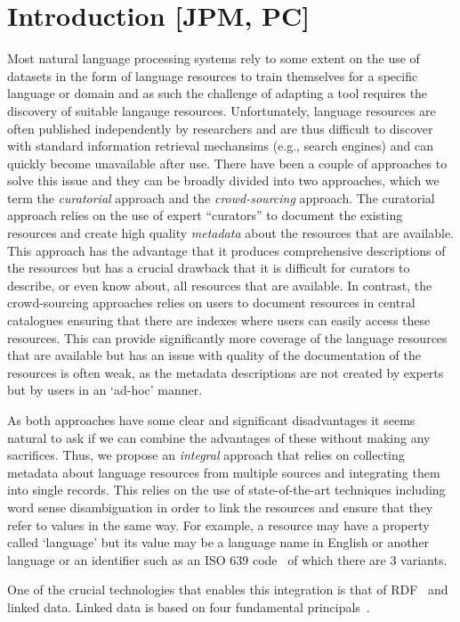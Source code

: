\documentclass[smallextended]{svjour3}       %
\begin{document}
\section{Introduction [JPM, PC]}

Most natural language processing systems rely to some extent on the use of
datasets in the form of language resources to train themselves for a specific
language or domain and as such the challenge of adapting a tool requires the
discovery of suitable langauge resources. Unfortunately, language resources are
often published independently by researchers and are thus difficult to discover
with standard information retrieval mechansims (e.g., search engines) and can
quickly become unavailable after use. There have been a couple of approaches to
solve this issue and they can be broadly divided into two approaches, which we
term the \emph{curatorial} approach and the \emph{crowd-sourcing} approach. The
curatorial approach relies on the use of expert ``curators'' to document the
existing resources and create high quality \emph{metadata} about the resources
that are available. This approach has the advantage that it produces
comprehensive descriptions of the resources but has a crucial drawback that it
is difficult for curators to describe, or even know about, all resources that
are available. In contrast, the crowd-sourcing approaches relies on users to
document resources in central catalogues ensuring that there are indexes where
users can easily access these resources. This can provide significantly more
coverage of the language resources that are available but has an issue with
quality of the documentation of the resources is often weak, as the metadata
descriptions are not created by experts but by users in an `ad-hoc' manner.

As both approaches have some clear and significant disadvantages it seems
natural to ask if we can combine the advantages of these without making any
sacrifices. Thus, we propose an \emph{integral} approach that relies on
collecting metadata about language resources from multiple sources and
integrating them into single records. This relies on the use of state-of-the-art
techniques including word sense disambiguation in order to link the resources
and ensure that they refer to values in the same way. For example, a resource
may have a property called `language' but its value may be a language name in
English or another language or an identifier such as an ISO 639
code~\cite{iso639} of which there are 3 variants. 

One of the crucial technologies that enables this integration is that of
RDF~\cite{rdf} and linked data. Linked data is based on four fundamental
principals~\cite{}.
\end{document}
